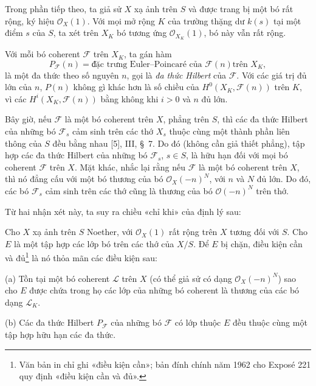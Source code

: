 
Trong phần tiếp theo, ta giả sử $X$ xạ ảnh trên $S$ và được trang bị một bó rất
rộng, ký hiệu $\mathcal O_X(1)$. Với mọi mở rộng $K$ của trường thặng dư $k(s)$
tại một điểm $s$ của $S$, ta xét trên $X_K$ bó tương ứng
$\mathcal O_{X_K}(1)$, bó này vẫn rất rộng.

Với mỗi bó coherent $\mathcal F$ trên $X_K$, ta gán hàm
\[
P_{\mathcal F}(n)=\text{đặc trưng Euler--Poincaré của $\mathcal F(n)$
trên $X_K$},
\]
là một đa thức theo số nguyên $n$, gọi là \emph{đa thức Hilbert} của
$\mathcal F$. Với các giá trị đủ lớn của $n$, $P(n)$ không gì khác hơn là số
chiều của $H^0(X_K,\mathcal F(n))$ trên $K$, vì các
$H^i(X_K,\mathcal F(n))$ bằng không khi $i>0$ và $n$ đủ lớn.

Bây giờ, nếu $\mathcal F$ là một bó coherent trên $X$, phẳng trên $S$, thì các
đa thức Hilbert của những bó $\mathcal F_s$ cảm sinh trên các thớ $X_s$ thuộc
cùng một thành phần liên thông của $S$ đều bằng nhau [5], III, \S~7. Do đó
(không cần giả thiết phẳng), tập hợp các đa thức Hilbert của những bó
$\mathcal F_s$, $s\in S$, là hữu hạn đối với mọi bó coherent $\mathcal F$ trên
$X$.
Mặt khác, nhắc lại rằng nếu $\mathcal F$ là một bó coherent trên $X$, thì nó
đẳng cấu với một bó thương của bó $\mathcal O_X(-n)^N$, với $n$ và $N$ đủ
lớn. Do đó, các bó $\mathcal F_s$ cảm sinh trên các thớ cũng là thương của bó
$\mathcal O(-n)^N$ trên thớ.

Từ hai nhận xét này, ta suy ra chiều «chỉ khi» của định lý sau:

 Cho $X$ xạ ảnh trên $S$ Noether, với
$\mathcal O_X(1)$ rất rộng trên $X$ tương đối với $S$. Cho $E$ là một tập hợp
các lớp bó trên các thớ của $X/S$. Để $E$ bị chặn, điều kiện cần và đủ\footnote{Văn
bản in chỉ ghi «điều kiện cần»; bản đính chính năm 1962 cho Exposé 221 quy định
«điều kiện cần và đủ».} là nó thỏa mãn các điều kiện sau:

\medskip
\noindent (a) Tồn tại một bó coherent $\mathcal L$ trên $X$ (có thể giả sử có
dạng $\mathcal O_X(-n)^N$) sao cho $E$ được chứa trong họ các lớp của những bó
coherent là thương của các bó dạng $\mathcal L_K$.

\smallskip
\noindent (b) Các đa thức Hilbert $P_{\mathcal F}$ của những bó $\mathcal F$
có lớp thuộc $E$ đều thuộc cùng một tập hợp hữu hạn các đa thức.

